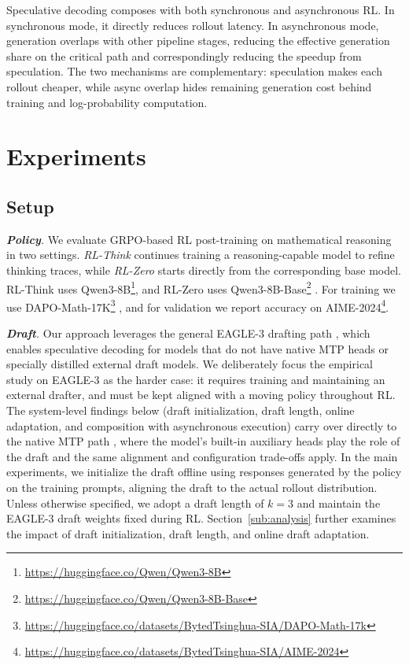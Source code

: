 \documentclass[11pt, logo, onecolumn, copyright, colorlinks=true, allcolors=blue]{nvidiatechreport}
\begin{document}
Speculative decoding composes with both synchronous and asynchronous RL. In synchronous mode, it directly reduces rollout latency. In asynchronous mode, generation overlaps with other pipeline stages, reducing the effective generation share on the critical path and correspondingly reducing the speedup from speculation. The two mechanisms are complementary: speculation makes each rollout cheaper, while async overlap hides remaining generation cost behind training and log-probability computation.

\section{Experiments}
\label{sec:experiments}

\subsection{Setup}

\emph{\textbf{Policy}.}
We evaluate GRPO-based RL post-training \citep{shao2024deepseekmath} on mathematical reasoning in two settings. \emph{RL-Think} continues training a reasoning-capable model to refine thinking traces, while \emph{RL-Zero} starts directly from the corresponding base model. RL-Think uses Qwen3-8B\footnote{\url{https://huggingface.co/Qwen/Qwen3-8B}}, and RL-Zero uses Qwen3-8B-Base\footnote{\url{https://huggingface.co/Qwen/Qwen3-8B-Base}} \citep{yang2025qwen3}. For training we use DAPO-Math-17K\footnote{\url{https://huggingface.co/datasets/BytedTsinghua-SIA/DAPO-Math-17k}} \citep{yu2025dapo}, and for validation we report accuracy on AIME-2024\footnote{\url{https://huggingface.co/datasets/BytedTsinghua-SIA/AIME-2024}}.

\emph{\textbf{Draft}.}
Our approach leverages the general EAGLE-3 drafting path \citep{li2024eagle,li2025eagle3}, which enables speculative decoding for models that do not have native MTP heads \citep{mtp2024,DeepSeekAI2025DeepSeekR1IR} or specially distilled external draft models. We deliberately focus the empirical study on EAGLE-3 as the harder case: it requires training and maintaining an external drafter, and must be kept aligned with a moving policy throughout RL. The system-level findings below (draft initialization, draft length, online adaptation, and composition with asynchronous execution) carry over directly to the native MTP path \citep{mtp2024}, where the model's built-in auxiliary heads play the role of the draft and the same alignment and configuration trade-offs apply. In the main experiments, we initialize the draft offline using responses generated by the policy on the training prompts, aligning the draft to the actual rollout distribution. Unless otherwise specified, we adopt a draft length of $k=3$ and maintain the EAGLE-3 draft weights fixed during RL. Section~\ref{sub:analysis} further examines the impact of draft initialization, draft length, and online draft adaptation.
\end{document}
